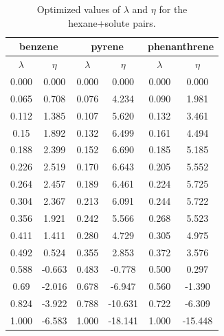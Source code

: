 \documentclass[final,12p,times,twocolumn]{elsarticle}
\begin{document}
	\section{}
	\label{}
	\begin{table}[h]
		\centering
		\caption{Optimized values of $\lambda $ and $\eta $ for the hexane+solute pairs.}
		\label{tbl:lambdahex}
		\begin{tabular}{cccccc}
			\hline\hline
			\multicolumn{2}{c}{benzene}&\multicolumn{2}{c}{pyrene}& \multicolumn{2}{c}{phenanthrene}\\
			\hline\hline
			$\lambda$ & $\eta$& $\lambda$ & $\eta$  & $\lambda$ & $\eta$   \\ 
			\hline\hline
			0.000     &0.000      & 0.000    &    0.000    &    0.000    &    0.000    \\
			0.065     &0.708  & 0.076    &    4.234    &    0.090    &    1.981    \\
			0.112     &1.385  & 0.107    &    5.620    &    0.132    &    3.461    \\
			0.15      &1.892  & 0.132    &    6.499    &    0.161    &    4.494    \\
			0.188     &2.399  & 0.152    &    6.690    &    0.185    &    5.185    \\
			0.226     &2.519  & 0.170    &    6.643    &    0.205    &    5.552    \\
			0.264     &2.457  & 0.189    &    6.461    &    0.224    &    5.725    \\
			0.304     &2.367  & 0.213    &    6.091    &    0.244    &    5.722    \\
			0.356     &1.921  & 0.242    &    5.566    &    0.268    &    5.523    \\
			0.411     &1.411  & 0.280    &    4.729    &    0.305    &    4.975    \\
			0.492     &0.524  & 0.355    &    2.853    &    0.372    &    3.576    \\
			0.588     &-0.663 & 0.483    &    -0.778    &    0.500    &    0.297    \\
			0.69      &-2.016 & 0.678    &    -6.947    &    0.560    &    -1.390    \\
			0.824     &-3.922 & 0.788    &    -10.631    &    0.722    &    -6.309    \\
			1.000         &-6.583  &1.000      &    -18.141    &    1.000    &    -15.448    \\
			\hline\hline   
		\end{tabular}
	\end{table}
\end{document}
